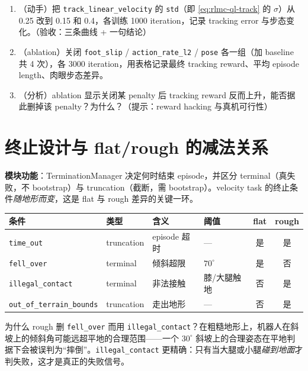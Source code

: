 \begin{practice}[奖励设计]
\begin{enumerate}
\item （动手）把 \verb|track_linear_velocity| 的 \verb|std|（即 \eqref{eq:rlmc-ql-track} 的 $\sigma$）从 0.25 改到 0.15 和 0.4，各训练 1000 iteration，记录 tracking error 与步态变化。（验收：三条曲线 + 一句结论）
\item （ablation）关闭 \verb|foot_slip| / \verb|action_rate_l2| / \verb|pose| 各一组（加 baseline 共 4 次），各 3000 iteration，用表格记录最终 tracking reward、平均 episode length、肉眼步态差异。
\item （分析）ablation 显示关闭某 penalty 后 tracking reward 反而上升，能否据此删掉该 penalty？为什么？（提示：reward hacking 与真机可行性）
\end{enumerate}
\end{practice}

\section{终止设计与 flat/rough 的减法关系}
\label{sec:rlmc-ql-termination}

\textbf{模块功能}：TerminationManager 决定何时结束 episode，并区分 terminal（真失败，不 bootstrap）与 truncation（截断，需 bootstrap）。velocity task 的终止条件\emph{随地形而变}，这是 flat 与 rough 差异的关键一环。

\begin{center}
\small
\begin{tabular}{@{}llllcc@{}}
\toprule
条件 & 类型 & 含义 & 阈值 & flat & rough \\
\midrule
\verb|time_out| & truncation & episode 超时 & --- & 是 & 是 \\
\verb|fell_over| & terminal & 倾斜超限 & $70^\circ$ & 是 & 否 \\
\verb|illegal_contact| & terminal & 非法接触 & 膝/大腿触地 & 否 & 是 \\
\verb|out_of_terrain_bounds| & truncation & 走出地形 & --- & 否 & 是 \\
\bottomrule
\end{tabular}
\end{center}

为什么 rough 删 \verb|fell_over| 而用 \verb|illegal_contact|？在粗糙地形上，机器人在斜坡上的倾斜角可能远超平地的合理范围——一个 $30^\circ$ 斜坡上的合理姿态在平地判据下会被误判为“摔倒”。\verb|illegal_contact| 更精确：只有当大腿或小腿\emph{碰到地面}才判失败，这才是真正的失败信号。

